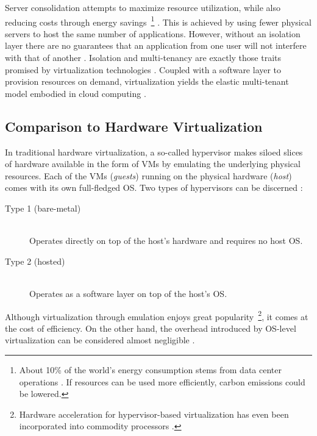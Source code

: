 Server consolidation attempts to maximize resource utilization, while also reducing costs through energy savings~\footnote{About 10\% of the world's energy consumption stems from data center operations \cite[p.~1]{scheepers2014virtualization}. If resources can be used more efficiently, carbon emissions could be lowered.} \cite[p.~233]{xavier2013performance} \cite[p.~2]{eder2016hypervisor}. This is achieved by using fewer physical servers to host the same number of applications. However, without an isolation layer there are no guarantees that an application from one user will not interfere with that of another \cite[p.~233]{xavier2013performance}. Isolation and multi-tenancy are exactly those traits promised by virtualization technologies \cite[p.~21]{da2018containers}. Coupled with a software layer to provision resources on demand, virtualization yields the elastic multi-tenant model embodied in \gls{cloud computing} \cite[p.~203]{kang2016container} \cite[p.~81]{bernstein2014containers} \cite[p.~24]{pahl2015containerization}.


\subsection{Comparison to Hardware Virtualization}
\label{sec:os-hardware-virtualization-comparison}

In traditional hardware virtualization, a so-called hypervisor makes siloed slices of hardware available in the form of \acp{VM} by emulating the underlying physical resources. Each of the \acp{VM} (\textit{guests}) running on the physical hardware (\textit{host}) comes with its own full-fledged \acs{OS}. Two types of hypervisors can be discerned \cite[p.~2]{merkel2014docker} \cite[p.~1]{eder2016hypervisor} \cite[pp.~386--387]{morabito2015hypervisors}:

\begin{description}
  \item[Type 1 (bare-metal)]
  \hfill \\
  Operates directly on top of the host's hardware and requires no host \acs{OS}.

  \item[Type 2 (hosted)]
  \hfill \\
  Operates as a software layer on top of the host's \acs{OS}.
\end{description}

Although virtualization through emulation enjoys great popularity~\footnote{Hardware acceleration for hypervisor-based virtualization has even been incorporated into commodity processors \cite[p.~233]{xavier2013performance}.}, it comes at the cost of efficiency. On the other hand, the overhead introduced by \acs{OS}-level virtualization can be considered almost negligible \cite[pp.~386,~392]{morabito2015hypervisors}.

